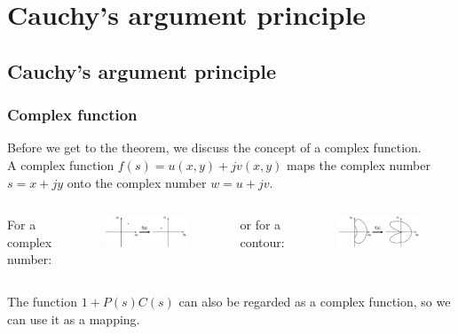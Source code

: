 \section{Cauchy's argument principle}

\subsection{Cauchy's argument principle}

\begin{frame}
	\frametitle{Complex function}
	Before we get to the theorem, we discuss the concept of a complex function.\\
	\smallskip
	A complex function $f(s)=u(x,y)+\mathit{j}v(x,y)$ maps the complex number $s=x+\mathit{j}y$ onto the complex number $w=u+\mathit{j}v$.
	\vspace{-2ex}
	\begin{columns}
		\begin{center}
			For a complex number:
		\end{center}
		\begin{figure}
			\includegraphics[width=1.0\linewidth]{complex1}
		\end{figure}
		\begin{center}
			or for a contour:
		\end{center}
		\begin{figure}
			\includegraphics[width=1.0\linewidth]{complex2}
		\end{figure}
	\end{columns}
	\medskip
	The function $1+P(s)C(s)$ can also be regarded as a complex function, so we can use it as a mapping.
\end{frame}

